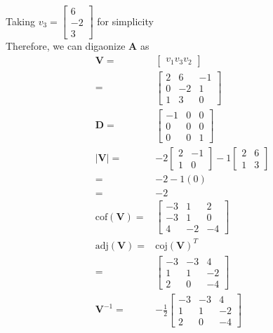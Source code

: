 \documentclass[12pt]{article}
\newcommand{\matr}[1]{\bm{#1}}
\begin{document}
Taking $v_3 = \begin{bmatrix}
6 \\ -2 \\ 3
\end{bmatrix} $  for simplicity\\
Therefore, we can digaonize $\matr A$ as
\begin{align}
	\matr V =& \begin{bmatrix}v_1 v_3 v_2\end{bmatrix} \\
	=               & \left[\begin{matrix}2              & 6  & -1 \\0 & -2 & 1\\1 & 3 & 0\end{matrix}\right] \\
	\matr D =       & \left[\begin{matrix}-1             & 0  & 0  \\0 & 0 & 0\\0 & 0 & 1\end{matrix}\right] \\
	|\matr V|=&-2
	\begin{bmatrix}
	2 & -1 \\
	1 & 0
	\end{bmatrix}
	-1
	\begin{bmatrix}
	2 & 6 \\
	1 & 3
	\end{bmatrix} \\
	=& -2 - 1 (0) \\
	=& -2 \\
	\textrm{cof} (\matr V) =& 
	\begin{bmatrix}
	-3 & 1 & 2 \\
	- 3 & 1 & 0 \\
	4 & -2 &  -4 
	\end{bmatrix} \\
	\textrm{adj}(\matr V) =& \textrm{coj}(\matr V) ^ T \\
	=               & \left[\begin{matrix}-3             & -3 & 4  \\1 & 1 & -2\\2 & 0 & -4\end{matrix}\right] \\
	\matr V ^{-1} = & - \frac 1 2 \left[\begin{matrix}-3 & -3 & 4  \\1 & 1 & -2\\2 & 0 & -4\end{matrix}\right] 
\end{align}
\end{document}
